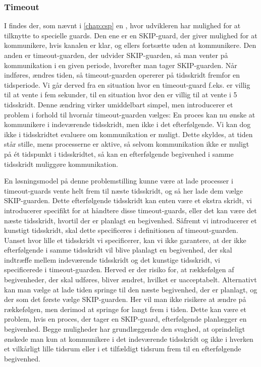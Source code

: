 \subsubsection{Timeout} 
I \pycsp findes der, som nævnt i \autoref{chap:csp} en , hvor udvikleren har mulighed for at tilknytte to specielle guards. Den ene er en SKIP-guard, der giver mulighed for at kommunikere, hvis kanalen er klar, og ellers fortsætte uden at kommunikere. Den anden er timeout-guarden, der udvider SKIP-guarden, så man venter på kommunikation i en given periode, hvorefter man tager SKIP-guarden. 
Når \des indføres, ændres tiden, så timeout-guarden opererer på tidsskridt fremfor en tidsperiode. Vi går derved fra en situation hvor en timeout-guard f.eks. er villig til at vente i fem sekunder, til en situation hvor den er villig til at vente i 5 tidsskridt. Denne ændring virker umiddelbart simpel, men introducerer et problem i forhold til hvornår timeout-guarden vælges: En proces kan nu ønske at kommunikere i indeværende tidsskridt, men ikke i det efterfølgende. Vi kan dog ikke i tidsskridtet evaluere om kommunikation er muligt. Dette skyldes, at tiden står stille, mens processerne er aktive, så selvom kommunikation ikke er muligt på ét tidspunkt i tidsskridtet, så kan en efterfølgende begivenhed i samme tidsskridt muliggøre kommunikation.


En løsningsmodel på denne problemstilling kunne være at lade processer i timeout-guards vente helt frem til næste tidsskridt, og så her lade dem vælge SKIP-guarden. Dette efterfølgende tidsskridt kan enten være et ekstra skridt, vi introducerer specifikt for at håndtere disse timeout-guards, eller det kan være det næste tidsskridt, hvortil der er planlagt en begivenhed. 
Såfremt vi introducerer et kunstigt tidsskridt, skal dette specificeres i definitionen af timeout-guarden. Uanset hvor lille et tidsskridt vi specificerer, kan vi ikke garantere, at der ikke efterfølgende i samme tidsskridt vil blive planlagt en begivenhed, der skal indtræffe mellem indeværende tidsskridt og det kunstige tidsskridt, vi specificerede i timeout-guarden. Herved er der risiko for, at rækkefølgen af begivenheder, der skal udføres, bliver ændret, hvilket er uacceptabelt. 
Alternativt kan man vælge at lade tiden springe til den næste begivenhed, der er planlagt, og der som det første vælge SKIP-guarden. Her vil man ikke risikere at ændre på rækkefølgen, men derimod at springe for langt frem i tiden. Dette kan være et problem, hvis en proces, der tager en SKIP-guard, efterfølgende planlægger en begivenhed.
Begge muligheder har grundlæggende den svaghed, at oprindeligt ønskede man kun at kommunikere i det indeværende tidsskridt og ikke i hverken et vilkårligt lille tidsrum eller i et tilfældigt tidsrum frem til en efterfølgende begivenhed.


